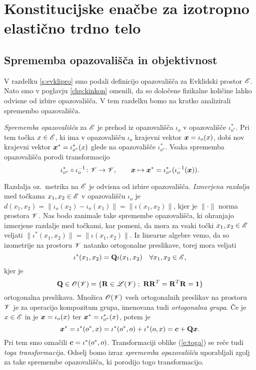 \appendix

\chapter{Konstitucijske enačbe za izotropno elastično trdno telo}


\section{Sprememba opazovališča in objektivnost}


V razdelku \ref{s:evklipro} smo podali definicijo opazovališča za Evklidski
prostor $\mathscr E$. Nato smo v poglavju \ref{chp:kinkon} omenili, da so določene
fizikalne količine lahko odvisne od izbire opazovališča. V tem razdelku bomo
na kratko analizirali spremembo opazovališča.

\emph{Sprememba opazovališča} za $\mathscr E$ je prehod iz opazovališča $\iota_o$ v opazovališče
$\iota^*_{o^*}$. Pri tem točka $x\in\mathscr E$, ki ima v opazovališču $\iota_o$ krajevni vektor
$\boldsymbol x=\iota_o(x)$, dobi nov krajevni vektor $\boldsymbol x^*=\iota^*_{o^*}(x)$ glede na opazovališče
$\iota^*_{o^*}$. Vsaka sprememba opazovališča porodi transformacijo
\[
	\iota^*_{o^*}\circ\iota_o^{-1}\colon\mathscr V\to\mathscr V,\qquad
	\boldsymbol x\mapsto\boldsymbol x^*=\iota^*_{o^*}(\iota_o^{-1}(\boldsymbol x)).
\]

Razdalja oz.~metrika na $\mathscr E$ je odvisna od izbire opazovališča. \emph{Izmerjena razdalja} med točkama
$x_1,x_2\in\mathscr E$ v opazovališču $\iota_o$ je
$d(x_1,x_2)=\|\iota_o(x_2)-\iota_o(x_1)\|=\|\iota(x_1,x_2)\|$,
kjer je $\|\cdot\|$ norma prostora $\mathscr V$. Nas bodo zanimale take
spremembe opazovališča, ki ohranjajo izmerjene razdalje med točkami, kar pomeni,
da mora za vsaki točki $x_1,x_2\in\mathscr E$ veljati
$\|\iota^*(x_1,x_2)\|=\|\iota(x_1,x_2)\|$.
Iz linearne algebre vemo, da so izometrije na prostoru $\mathscr V$ natanko ortogonalne preslikave,
torej mora veljati
\begin{equation} \label{e:vektrans}
	\iota^*(x_1,x_2)=\mathbf Q\iota(x_1,x_2)\quad\forall x_1,x_2\in\mathscr E,
\end{equation}
kjer je
\[
	\ten{Q}\in\mathscr{O}(\V)=\{\ten{R}\in\L(\V)\;;\ \ten{R}\ten{R}^T=\ten{R}^T\ten{R}=\ten{1}\}
\]
ortogonalna preslikava. Množica $\mathscr{O}(\mathscr V)$ vseh ortogonalnih preslikav na prostoru
$\mathscr V$ je za operacijo kompozitum grupa, imenovana tudi \emph{ortogonalna grupa}. Če je $x\in\mathscr E$ in
je $\boldsymbol x=\iota_o(x)$ ter $\boldsymbol x^*=\iota^*_{o^*}(x)$, potem je
\begin{equation} \label{e:toga}
	\boldsymbol x^*=\iota^*(o^*,x)=\iota^*(o^*,o)+\iota^*(o,x)=\boldsymbol c+\mathbf Q\boldsymbol x.
\end{equation}
Pri tem smo označili $\boldsymbol c=\iota^*(o^*,o)$. Transformaciji oblike (\ref{e:toga})
se reče tudi \emph{toga transformacija}. Odselj bomo izraz \textit{sprememba opazovališča}
uporabljali zgolj za take spremembe opazovališča, ki porodijo togo transformacijo.

